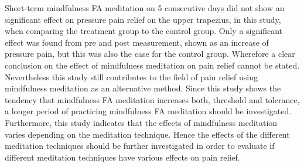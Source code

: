 Short-term mindfulness FA meditation on 5 consecutive days did not show an significant effect on pressure pain relief on the upper trapezius, in this study, when comparing the treatment group to the control group. Only a significant effect was found from pre and post measurement, shown as an increase of pressure pain, but this was also the case for the control group. Wherefore a clear conclusion on the effect of mindfulness meditation on pain relief cannot be stated. Nevertheless this study still contributes to the field of pain relief using mindfulness meditation as an alternative method. Since this study shows the tendency that mindfulness FA meditation increases both, threshold and tolerance, a longer period of practicing mindfulness FA meditation should be investigated. Furthermore, this study indicates that the effects of mindfulness meditation varies depending on the meditation technique. Hence the effects of the different meditation techniques should be further investigated in order to evaluate if different meditation techniques have various effects on pain relief. 
